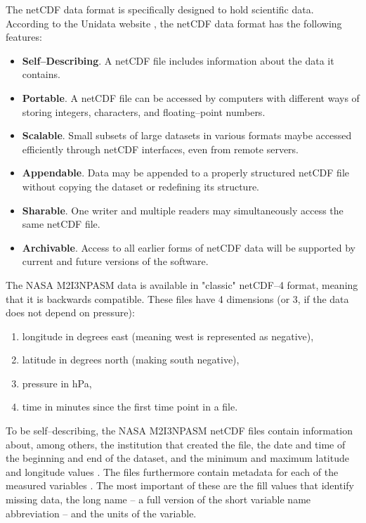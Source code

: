 \documentclass[../00_main.tex]{subfiles}
\begin{document}
The netCDF data format is specifically designed to hold scientific data.
According to the Unidata website \cite{netcdf}, the netCDF data format has the 
following features:
\begin{itemize}
    \item \textbf{Self--Describing}. A netCDF file includes information about 
        the data it contains.
    \item \textbf{Portable}. A netCDF file can be accessed by computers with 
        different ways of storing integers, characters, and floating--point 
        numbers.
    \item \textbf{Scalable}. Small subsets of large datasets in various formats 
        maybe accessed efficiently through netCDF interfaces, even from remote 
        servers.
    \item \textbf{Appendable}. Data may be appended to a properly structured 
        netCDF file without copying the dataset or redefining its structure.
    \item \textbf{Sharable}. One writer and multiple readers may simultaneously 
        access the same netCDF file.
    \item \textbf{Archivable}. Access to all earlier forms of netCDF data will 
        be supported by current and future versions of the software.
\end{itemize}
The NASA M2I3NPASM data is available in "classic" netCDF--4 format, meaning that
it is backwards compatible. These files have 4 dimensions \cite{merra2-files}
(or 3, if the data does not depend on pressure):
\begin{enumerate}
    \item longitude in degrees east (meaning west is represented as negative),
    \item latitude in degrees north (making south negative),
    \item pressure in hPa,
    \item time in minutes since the first time point in a file.
\end{enumerate}
To be self--describing, the NASA M2I3NPASM netCDF files contain information
about, among others, the institution that created the file, the date and time 
of the beginning and end of the dataset, and the minimum and maximum latitude 
and longitude values \cite{merra2-files}. The files furthermore contain 
metadata for each of the measured variables \cite{merra2-files}. The most 
important of these are the fill values that identify missing data, the long 
name -- a full version of the short variable name abbreviation -- and the units 
of the variable.
\end{document}
